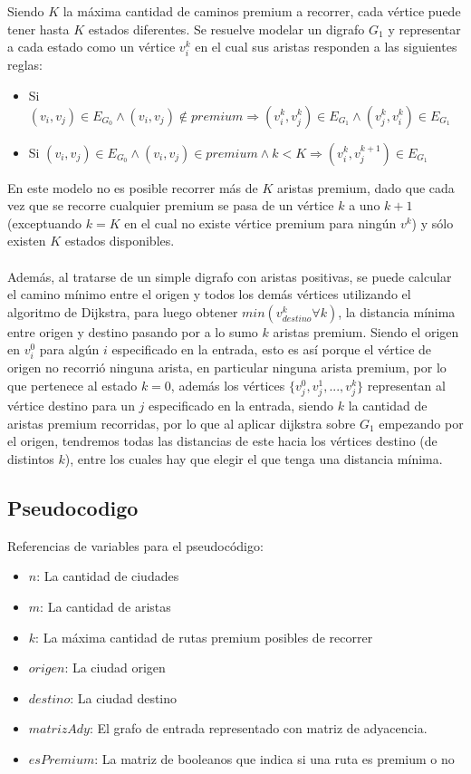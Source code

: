 Siendo $K$ la máxima cantidad de caminos premium a recorrer, cada vértice puede tener hasta $K$ estados diferentes. Se resuelve modelar un digrafo $G_1$ y representar a cada estado como un vértice $v_i^k$ en el cual sus aristas responden a las siguientes reglas:
\begin{itemize}
	\item Si $(v_i,v_j) \in E_{G_0} \land (v_i,v_j) \notin premium \Rightarrow (v_i^k,v_j^k) \in E_{G_1} \land (v_j^k,v_i^k) \in E_{G_1}$
	\item Si $(v_i,v_j) \in E_{G_0} \land (v_i,v_j) \in premium \land k < K \Rightarrow (v_i^k,v_j^{k+1}) \in E_{G_1}$
\end{itemize}
En este modelo no es posible recorrer más de $K$ aristas premium, dado que cada vez que se recorre cualquier premium se pasa de un vértice $k$ a uno $k+1$ (exceptuando $k=K$ en el cual no existe vértice premium para ningún $v^k$) y sólo existen $K$ estados disponibles.\\\\
Además, al tratarse de un simple digrafo con aristas positivas, se puede calcular el camino mínimo entre el origen y todos los demás vértices utilizando el algoritmo de Dijkstra, para luego obtener $min(v_{destino}^k \forall k)$, la distancia mínima entre origen y destino pasando por a lo sumo $k$ aristas premium. Siendo el origen en $v_i^0$ para algún $i$ especificado en la entrada, esto es así porque el vértice de origen no recorrió ninguna arista, en particular ninguna arista premium, por lo que pertenece al estado $k=0$, además los vértices $\{v_j^0,v_j^1,...,v_j^k\}$ representan al vértice destino para un $j$ especificado en la entrada, siendo $k$ la cantidad de aristas premium recorridas, por lo que al aplicar dijkstra sobre $G_1$ empezando por el origen, tendremos todas las distancias de este hacia los vértices destino (de distintos $k$), entre los cuales hay que elegir el que tenga una distancia mínima. \\

\subsection{Pseudocodigo}

Referencias de variables para el pseudocódigo:

\begin{itemize}
	\item $n$: La cantidad de ciudades
	\item $m$: La cantidad de aristas
	\item $k$: La máxima cantidad de rutas premium posibles de recorrer
	\item $origen$: La ciudad origen
	\item $destino$: La ciudad destino
	\item $matrizAdy$: El grafo de entrada representado con matriz de adyacencia.
	\item $esPremium$: La matriz de booleanos que indica si una ruta es premium o no
\end{itemize}

